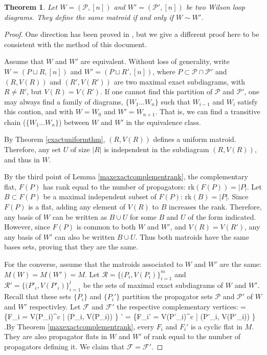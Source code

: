 \documentclass[11pt]{article}
\newcommand{\rk}{\textrm{rk} }
\def\bas #1\eas{\begin{align*} #1 \end{align*}}
\newcommand{\cP}{\mathcal{P}}
\newtheorem{thm}{Theorem}[section]
\theoremstyle{remark}
\theoremstyle{definition}
\begin{document}
\begin{thm}\label{same matroid iff equiv}
Let $W= (\cP, [n])$ and $W'= (\cP', [n])$ be two Wilson loop diagrams. They define the same matroid if and only if $W \sim W'$.
\end{thm}

\begin{proof}
One direction has been proved in \cite[Theorem 1.18]{wilsonloop}, but we give a different proof here to be consistent with the method of this document.

Assume that $W$ and $W'$ are equivalent. Without loss of generality, write $W = (P \sqcup R, [n])$ and $W' = (P \sqcup R', [n])$, where $P \subset \cP \cap \cP'$ and $(R, V(R))$ and $(R', V(R'))$ are two maximal exact subdiagrams, with $R \neq R'$, but $V(R) = V(R')$. If one cannot find this partition of $\cP$ and $\cP'$, one may always find a family of diagrams, $\{W_1 \ldots W_n\}$ such that $W_{i-1}$ and $W_i$ satisfy this contion, and with $W = W_0$ and $W' = W_{n+1}$. That is, we can find a  transitive chain ($\{W_1 \ldots W_n\}$) between $W$ and $W'$ in the equivalence class.

By Theorem \ref{exactuniformthm}, $(R, V(R))$ defines a uniform matroid. Therefore, any set $U$ of size $|R|$ is independent in the subdiagram $(R, V(R))$, and thus in $W$. 

By the third point of Lemma \ref{maxexactcomplementrank}, the complementary flat, $F(P)$ has rank equal to the number of propagators: $\rk(F(P)) = |P|$. Let $B \subset F(P)$ be a maximal independent subset of $F(P)$: $\rk (B) = |P|$. Since $F(P)$ is a flat, adding any element of $V(R)$ to $B$ increases the rank. Therefore, any basis of $W$ can be written as $B \cup U$ for some $B$ and $U$ of the form indicated. However, since $F(P)$ is common to both $W$ and $W'$, and $V(R) = V(R')$, any any basis of $W'$ can also be written $B \cup U$. Thus both matroids have the same bases sets, proving that they are the same.

For the converse, assume that the matroids associated to $W$ and $W'$ are the same: $M(W) = M(W')= M$. Let $\mathcal{R} = \{(P_i, V(P_i)\}_{i=1}^m$ and $\mathcal{R}' = \{(P'_i, V(P'_i)\}_{i=1}^l$ be the sets of maximal exact subdiagrams of $W$ and $W'$. Recall that these sets $\{P_i\}$ and $\{P_i'\}$ partition the propagator sets $\cP$ and $\cP'$ of $W$ and $W'$ respectivley. Let $\mathcal{F}$ and $\mathcal{F}'$ the respective complementary vertices: \bas \mathcal{F} = \{F_i = V(P_i)^c | (P_i, V(P_i)) \in {}\} \quad  {}' = \{F_i' = V(P'_i)^c | (P'_i, V(P'_i)) \in {}\} \;.\eas By Theorem \ref{maxexactcomplementrank}, every $F_i$ and $F_i'$ is a cyclic flat in $M$. They are also propagator flats in $W$ and $W'$ of rank equal to the number of propagators defining it. We claim that $\mathcal{F} = \mathcal{F'}$. 


\end{proof}
\end{document}
